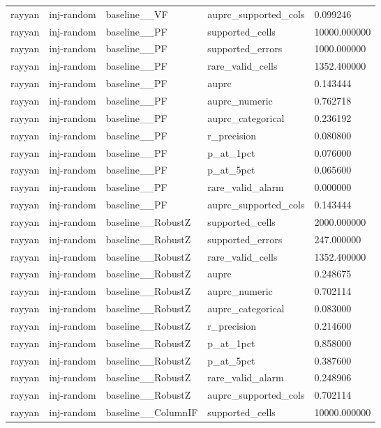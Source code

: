 \begin{tabular}{lllll}
rayyan & inj-random & baseline\_\_VF & auprc\_supported\_cols & 0.099246 \\
rayyan & inj-random & baseline\_\_PF & supported\_cells & 10000.000000 \\
rayyan & inj-random & baseline\_\_PF & supported\_errors & 1000.000000 \\
rayyan & inj-random & baseline\_\_PF & rare\_valid\_cells & 1352.400000 \\
rayyan & inj-random & baseline\_\_PF & auprc & 0.143444 \\
rayyan & inj-random & baseline\_\_PF & auprc\_numeric & 0.762718 \\
rayyan & inj-random & baseline\_\_PF & auprc\_categorical & 0.236192 \\
rayyan & inj-random & baseline\_\_PF & r\_precision & 0.080800 \\
rayyan & inj-random & baseline\_\_PF & p\_at\_1pct & 0.076000 \\
rayyan & inj-random & baseline\_\_PF & p\_at\_5pct & 0.065600 \\
rayyan & inj-random & baseline\_\_PF & rare\_valid\_alarm & 0.000000 \\
rayyan & inj-random & baseline\_\_PF & auprc\_supported\_cols & 0.143444 \\
rayyan & inj-random & baseline\_\_RobustZ & supported\_cells & 2000.000000 \\
rayyan & inj-random & baseline\_\_RobustZ & supported\_errors & 247.000000 \\
rayyan & inj-random & baseline\_\_RobustZ & rare\_valid\_cells & 1352.400000 \\
rayyan & inj-random & baseline\_\_RobustZ & auprc & 0.248675 \\
rayyan & inj-random & baseline\_\_RobustZ & auprc\_numeric & 0.702114 \\
rayyan & inj-random & baseline\_\_RobustZ & auprc\_categorical & 0.083000 \\
rayyan & inj-random & baseline\_\_RobustZ & r\_precision & 0.214600 \\
rayyan & inj-random & baseline\_\_RobustZ & p\_at\_1pct & 0.858000 \\
rayyan & inj-random & baseline\_\_RobustZ & p\_at\_5pct & 0.387600 \\
rayyan & inj-random & baseline\_\_RobustZ & rare\_valid\_alarm & 0.248906 \\
rayyan & inj-random & baseline\_\_RobustZ & auprc\_supported\_cols & 0.702114 \\
rayyan & inj-random & baseline\_\_ColumnIF & supported\_cells & 10000.000000 \\

\end{tabular}
